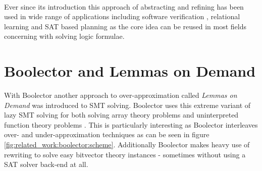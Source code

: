 \paragraph{}
Ever since its introduction this approach of abstracting and refining has been used in wide range of applications including software verification \cite{CEGAR}, relational learning \cite{CEGAR-Relational-Learning} and SAT based planning \cite{CEGAR-Planning} as the core idea can be reused in most fields concerning with solving logic formulae.



\section{Boolector and Lemmas on Demand}
With Boolector \cite{Brummayer-Biere2009_Chapter_BoolectorAnEfficientSMTSolverF} another approach to over-approximation called \textit{Lemmas on Demand} was introduced to SMT solving. Boolector uses this extreme variant of lazy SMT solving for both solving array theory problems \cite{p6-brummayer} and uninterpreted function theory problems \cite{NiemetzPreinerBiere-FMCAD14}.
This is particularly interesting as Boolector interleaves over- and under-approximation techniques as can be seen in figure \ref{fig:related_work:boolector:scheme}.
Additionally Boolector makes heavy use of rewriting to solve easy bitvector theory instances - sometimes without using a SAT solver back-end at all.
